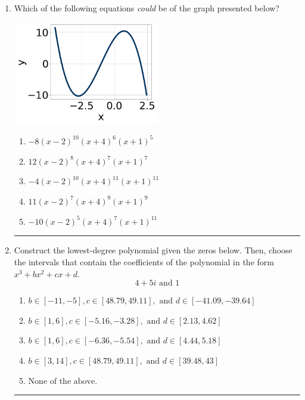 \documentclass[14pt]{extbook}
\newcommand{\litem}[1]{\item#1\hspace*{-1cm}\rule{\textwidth}{0.4pt}}
\begin{document}
\begin{enumerate}
\litem{
Which of the following equations \textit{could} be of the graph presented below?
\begin{center}
    \includegraphics[width=0.5\textwidth]{../Figures/polyGraphToFunctionB.png}
\end{center}
\begin{enumerate}[label=\Alph*.]
\item \( -8(x - 2)^{10} (x + 4)^{6} (x + 1)^{5} \)
\item \( 12(x - 2)^{8} (x + 4)^{7} (x + 1)^{7} \)
\item \( -4(x - 2)^{10} (x + 4)^{11} (x + 1)^{11} \)
\item \( 11(x - 2)^{7} (x + 4)^{9} (x + 1)^{9} \)
\item \( -10(x - 2)^{5} (x + 4)^{7} (x + 1)^{11} \)

\end{enumerate} }
\litem{
Construct the lowest-degree polynomial given the zeros below. Then, choose the intervals that contain the coefficients of the polynomial in the form $x^3+bx^2+cx+d$.\[ 4 + 5 i \text{ and } 1 \]\begin{enumerate}[label=\Alph*.]
\item \( b \in [-11, -5], c \in [48.79, 49.11], \text{ and } d \in [-41.09, -39.64] \)
\item \( b \in [1, 6], c \in [-5.16, -3.28], \text{ and } d \in [2.13, 4.62] \)
\item \( b \in [1, 6], c \in [-6.36, -5.54], \text{ and } d \in [4.44, 5.18] \)
\item \( b \in [3, 14], c \in [48.79, 49.11], \text{ and } d \in [39.48, 43] \)
\item \( \text{None of the above.} \)


\end{enumerate}}
\end{enumerate}
\end{document}

